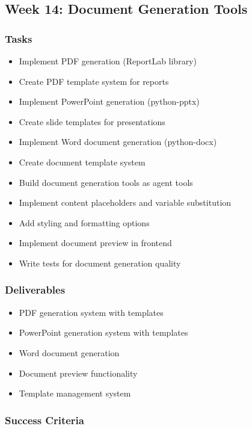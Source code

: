 \documentclass[12pt,oneside]{report}
\begin{document}
\subsection{Week 14: Document Generation Tools}

\subsubsection{Tasks}

\begin{itemize}
    \item Implement PDF generation (ReportLab library)
    \item Create PDF template system for reports
    \item Implement PowerPoint generation (python-pptx)
    \item Create slide templates for presentations
    \item Implement Word document generation (python-docx)
    \item Create document template system
    \item Build document generation tools as agent tools
    \item Implement content placeholders and variable substitution
    \item Add styling and formatting options
    \item Implement document preview in frontend
    \item Write tests for document generation quality
\end{itemize}

\subsubsection{Deliverables}

\begin{itemize}
    \item PDF generation system with templates
    \item PowerPoint generation system with templates
    \item Word document generation
    \item Document preview functionality
    \item Template management system
\end{itemize}

\subsubsection{Success Criteria}
\end{document}
